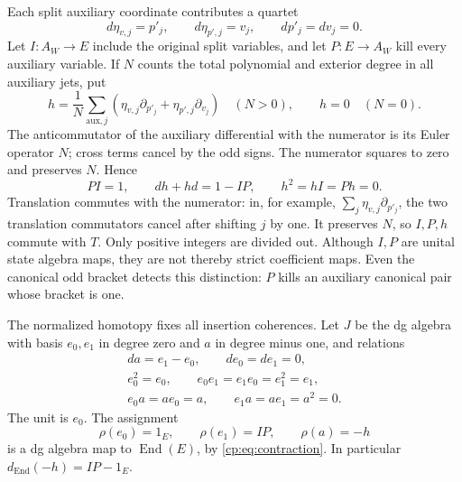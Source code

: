 Each split auxiliary coordinate contributes a quartet
\[
 d\eta_{v,j}=p'_j,\qquad d\eta_{p',j}=v_j,\qquad
 dp'_j=dv_j=0.
\]
Let \(I:A_W\to E\) include the original split variables, and let
\(P:E\to A_W\) kill every auxiliary variable.  If \(N\) counts
the total polynomial and exterior degree in all auxiliary jets, put
\begin{equation}\label{cp:eq:homotopy}
 h=\frac1N\sum_{\mathrm{aux},j}
       \left(\eta_{v,j}\partial_{p'_j}
                    +\eta_{p',j}\partial_{v_j}\right)
 \quad(N>0),\qquad h=0\quad(N=0).
\end{equation}
The anticommutator of the auxiliary differential with the numerator
is its Euler operator \(N\); cross terms cancel by the odd signs.
The numerator squares to zero and preserves \(N\).  Hence
\begin{equation}\label{cp:eq:contraction}
 PI=1,\qquad dh+hd=1-IP,\qquad h^2=hI=Ph=0.
\end{equation}
Translation commutes with the numerator: in, for example,
\(\sum_j\eta_{v,j}\partial_{p'_j}\), the two translation
commutators cancel after shifting \(j\) by one.  It preserves \(N\),
so \(I,P,h\) commute with \(T\).  Only positive integers are
divided out.  Although \(I,P\) are unital state algebra maps,
they are not thereby strict coefficient maps.  Even the canonical
odd bracket detects this distinction: \(P\) kills an auxiliary
canonical pair whose bracket is one.

The normalized homotopy fixes all insertion coherences.
Let \(J\) be the dg algebra with basis \(e_0,e_1\) in degree zero
and \(a\) in degree minus one, and relations
\begin{equation}\label{cp:eq:interval}
 \begin{gathered}
 da=e_1-e_0,\qquad de_0=de_1=0,\\
 e_0^2=e_0,\qquad e_0e_1=e_1e_0=e_1^2=e_1,\\
 e_0a=ae_0=a,\qquad e_1a=ae_1=a^2=0.
 \end{gathered}
\end{equation}
The unit is \(e_0\).  The assignment
\begin{equation}\label{cp:eq:edge}
 \rho(e_0)=1_E,\qquad \rho(e_1)=IP,\qquad \rho(a)=-h
\end{equation}
is a dg algebra map to \(\operatorname{End}(E)\), by
\eqref{cp:eq:contraction}.  In particular
\(d_{\operatorname{End}}(-h)=IP-1_E\).

